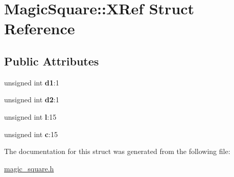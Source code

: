 \hypertarget{structMagicSquare_1_1XRef}{\section{\-Magic\-Square\-:\-:\-X\-Ref \-Struct \-Reference}
\label{structMagicSquare_1_1XRef}
}
\subsection*{\-Public \-Attributes}
\begin{DoxyCompactItemize}
\item 
\hypertarget{structMagicSquare_1_1XRef_a9da1ebfcf74bd506f8705783e92d764f}{unsigned int {\bfseries d1}\-:1}\label{structMagicSquare_1_1XRef_a9da1ebfcf74bd506f8705783e92d764f}

\item 
\hypertarget{structMagicSquare_1_1XRef_ad1d07d5c5ff273961e4329af5a8ff2d0}{unsigned int {\bfseries d2}\-:1}\label{structMagicSquare_1_1XRef_ad1d07d5c5ff273961e4329af5a8ff2d0}

\item 
\hypertarget{structMagicSquare_1_1XRef_af86bd806c544303f25ee0feca31afc57}{unsigned int {\bfseries l}\-:15}\label{structMagicSquare_1_1XRef_af86bd806c544303f25ee0feca31afc57}

\item 
\hypertarget{structMagicSquare_1_1XRef_aac7b71199e3718a13b6a7853469ace7e}{unsigned int {\bfseries c}\-:15}\label{structMagicSquare_1_1XRef_aac7b71199e3718a13b6a7853469ace7e}

\end{DoxyCompactItemize}


\-The documentation for this struct was generated from the following file\-:\begin{DoxyCompactItemize}
\item 
\hyperlink{magic__square_8h}{magic\-\_\-square.\-h}\end{DoxyCompactItemize}
